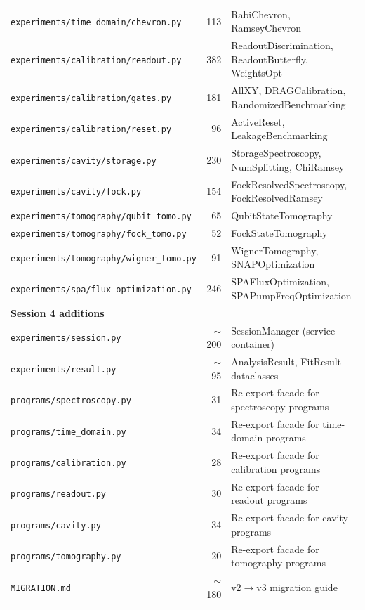 \documentclass[11pt]{article}
\begin{document}
\begin{longtable}{lrl}
\texttt{experiments/time\_domain/chevron.py}    & 113 & RabiChevron, RamseyChevron \\
\texttt{experiments/calibration/readout.py}     & 382 & ReadoutDiscrimination, ReadoutButterfly, WeightsOpt \\
\texttt{experiments/calibration/gates.py}       & 181 & AllXY, DRAGCalibration, RandomizedBenchmarking \\
\texttt{experiments/calibration/reset.py}       &  96 & ActiveReset, LeakageBenchmarking \\
\texttt{experiments/cavity/storage.py}          & 230 & StorageSpectroscopy, NumSplitting, ChiRamsey \\
\texttt{experiments/cavity/fock.py}             & 154 & FockResolvedSpectroscopy, FockResolvedRamsey \\
\texttt{experiments/tomography/qubit\_tomo.py}  &  65 & QubitStateTomography \\
\texttt{experiments/tomography/fock\_tomo.py}   &  52 & FockStateTomography \\
\texttt{experiments/tomography/wigner\_tomo.py} &  91 & WignerTomography, SNAPOptimization \\
\texttt{experiments/spa/flux\_optimization.py}  & 246 & SPAFluxOptimization, SPAPumpFreqOptimization \\
\midrule
\multicolumn{3}{l}{\textbf{Session 4 additions}} \\
\midrule
\texttt{experiments/session.py}              & $\sim$200 & SessionManager (service container) \\
\texttt{experiments/result.py}               & $\sim$95  & AnalysisResult, FitResult dataclasses \\
\texttt{programs/spectroscopy.py}            &  31 & Re-export facade for spectroscopy programs \\
\texttt{programs/time\_domain.py}            &  34 & Re-export facade for time-domain programs \\
\texttt{programs/calibration.py}             &  28 & Re-export facade for calibration programs \\
\texttt{programs/readout.py}                 &  30 & Re-export facade for readout programs \\
\texttt{programs/cavity.py}                  &  34 & Re-export facade for cavity programs \\
\texttt{programs/tomography.py}              &  20 & Re-export facade for tomography programs \\
\texttt{MIGRATION.md}                        & $\sim$180 & v2$\rightarrow$v3 migration guide \\

\end{longtable}
\end{document}
